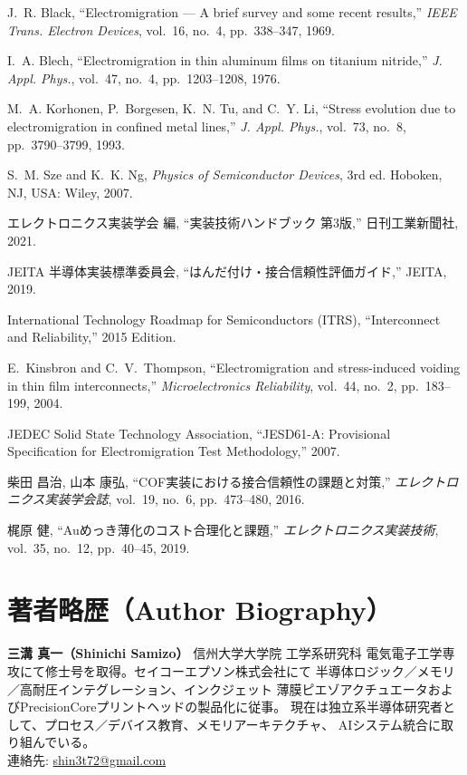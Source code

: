 \documentclass[conference]{IEEEtran}
\begin{document}
\balance

\begin{thebibliography}{99}

J.~R. Black, ``Electromigration --- A brief survey and some recent results,''
\emph{IEEE Trans. Electron Devices}, vol.~16, no.~4, pp.~338--347, 1969.

I.~A. Blech, ``Electromigration in thin aluminum films on titanium nitride,''
\emph{J. Appl. Phys.}, vol.~47, no.~4, pp.~1203--1208, 1976.

M.~A. Korhonen, P.~Borgesen, K.~N. Tu, and C.~Y. Li,
``Stress evolution due to electromigration in confined metal lines,''
\emph{J. Appl. Phys.}, vol.~73, no.~8, pp.~3790--3799, 1993.

S.~M. Sze and K.~K. Ng, \emph{Physics of Semiconductor Devices}, 3rd ed.
Hoboken, NJ, USA: Wiley, 2007.

エレクトロニクス実装学会 編, 
``実装技術ハンドブック 第3版,'' 日刊工業新聞社, 2021.

JEITA 半導体実装標準委員会, 
``はんだ付け・接合信頼性評価ガイド,'' JEITA, 2019.

International Technology Roadmap for Semiconductors (ITRS), 
``Interconnect and Reliability,'' 2015 Edition.

E.~Kinsbron and C.~V.~Thompson, 
``Electromigration and stress-induced voiding in thin film interconnects,''
\emph{Microelectronics Reliability}, vol.~44, no.~2, pp.~183--199, 2004.

JEDEC Solid State Technology Association, 
``JESD61-A: Provisional Specification for Electromigration Test Methodology,'' 2007.

柴田 昌治, 山本 康弘, 
``COF実装における接合信頼性の課題と対策,''
\emph{エレクトロニクス実装学会誌}, vol.~19, no.~6, pp.~473--480, 2016.

梶原 健, ``Auめっき薄化のコスト合理化と課題,'' 
\emph{エレクトロニクス実装技術}, vol.~35, no.~12, pp.~40--45, 2019.

\end{thebibliography}

\section*{著者略歴（Author Biography）}
\textbf{三溝 真一（Shinichi Samizo）} 信州大学大学院 工学系研究科
電気電子工学専攻にて修士号を取得。セイコーエプソン株式会社にて
半導体ロジック／メモリ／高耐圧インテグレーション、インクジェット
薄膜ピエゾアクチュエータおよびPrecisionCoreプリントヘッドの製品化に従事。
現在は独立系半導体研究者として、プロセス／デバイス教育、メモリアーキテクチャ、
AIシステム統合に取り組んでいる。\\
連絡先: \href{mailto:shin3t72@gmail.com}{shin3t72@gmail.com}
\end{document}
